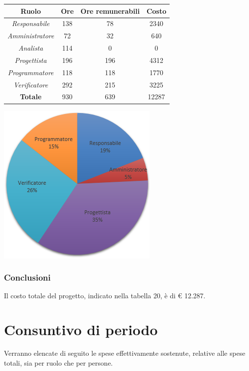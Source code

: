 \begin{center}
  \centering
  \begin{tabular}{|c|c|c|c|}
    \hline
    \textbf{Ruolo} & \textbf{Ore} & \textbf{Ore remunerabili} & \textbf{Costo} \\
    \hline  \emph{Responsabile}  & 138 & 78 & 2340 \\
    \hline  \emph{Amministratore}  & 72 & 32 & 640 \\
    \hline  \emph{Analista}  & 114 & 0 & 0 \\
    \hline  \emph{Progettista}  & 196 & 196 & 4312 \\
    \hline  \emph{Programmatore}  & 118 & 118 & 1770 \\
    \hline  \emph{Verificatore}  & 292 & 215 & 3225 \\
    \hline
    \textbf{Totale} & 930 & 639 & 12287 \\
    \hline
  \end{tabular}
  \includegraphics[scale=0.7]{img/7-Totale.png}
\end{center}

\subsubsection{Conclusioni}

Il costo totale del progetto, indicato nella tabella 20, è di € 12.287.

\section{Consuntivo di periodo}

Verranno elencate di seguito le spese effettivamente sostenute, relative alle spese totali, sia per ruolo che per persone.

